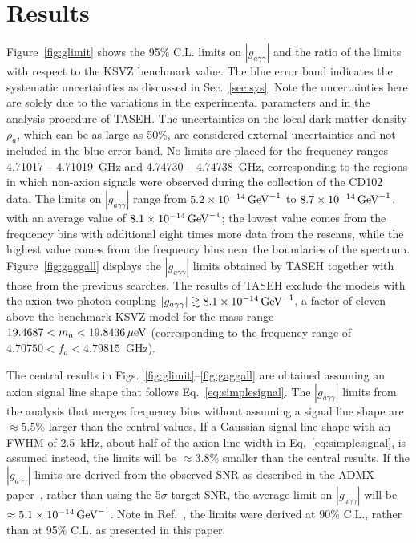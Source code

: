 \documentclass[%
reprint, %
superscriptaddress,
 amsmath,amssymb,
 aps
]{revtex4-2}
\begin{document}
 
\section{Results} \label{sec:results}

Figure~\ref{fig:glimit} shows the 95\% C.L. limits on 
$\left|g_{a\gamma\gamma}\right|$ and the ratio of the limits  
with respect to the KSVZ benchmark value.  
The blue error band indicates the systematic uncertainties as discussed in 
Sec.~\ref{sec:sys}. Note the uncertainties here are solely due to the 
variations in the experimental parameters and in the analysis procedure 
of TASEH. The uncertainties on the local dark matter density $\rho_a$,
 which can be as large as 50\%, are considered external uncertainties 
and not included in the blue error band.  
No limits are placed for the frequency ranges  
4.71017 -- 4.71019~GHz and 4.74730 -- 4.74738~GHz, corresponding to 
the regions in which non-axion signals were observed 
during the collection of the CD102 data. The limits on 
$\left|g_{a\gamma\gamma}\right|$ range from 
$5.2\times 10^{-14}\,\text{Ge\hspace{-.08em}V}^{-1}$ to 
$8.7\times 10^{-14}\,\text{Ge\hspace{-.08em}V}^{-1}$, 
with an average 
value of $8.1\times 10^{-14}\,\text{Ge\hspace{-.08em}V}^{-1}$; the lowest 
value comes from the frequency bins with 
additional eight times more data from the rescans, while the highest value 
comes from the frequency bins near the boundaries of the spectrum. 
Figure~\ref{fig:gaggall} displays the $\left|g_{a\gamma\gamma}\right|$ limits 
obtained by TASEH together with those from the previous searches. 
The results of TASEH exclude the models with the axion-two-photon coupling 
$\left|g_{a\gamma\gamma}\right|\gtrsim 8.1\times 10^{-14}\,\text{Ge\hspace{-.08em}V}^{-1}$, 
a factor of eleven above the benchmark
KSVZ model for the mass range 
$19.4687 < m_a < 19.8436 \,\mu\text{e\hspace{-.08em}V}$ (corresponding to 
the frequency range of $4.70750 < f_a < 4.79815$~GHz). 


The central results in Figs.~\ref{fig:glimit}--\ref{fig:gaggall} are 
obtained assuming an axion signal line shape that follows 
Eq.~\eqref{eq:simplesignal}. The $\left|g_{a\gamma\gamma}\right|$ limits from 
the analysis that merges frequency bins without assuming a signal line shape 
are $\approx5.5$\% larger than the central values. 
If a Gaussian signal line shape with an FWHM of 2.5~kHz,  
about half of the axion line width in Eq.~\eqref{eq:simplesignal}, is 
assumed instead, the limits will be $\approx3.8$\% smaller than the central 
results. If the $\left|g_{a\gamma\gamma}\right|$ limits are derived from the 
observed SNR as described in the ADMX paper~\cite{ADMXVIII}, 
rather than using the 5$\sigma$ target SNR, the average limit on 
$\left|g_{a\gamma\gamma}\right|$ will 
be $\approx 5.1\times 10^{-14}\,\text{Ge\hspace{-.08em}V}^{-1}$. 
Note in Ref.~\cite{ADMXVIII}, the limits were derived at 90\% C.L., 
rather than at 95\% C.L. as presented in this paper. 
\end{document}
